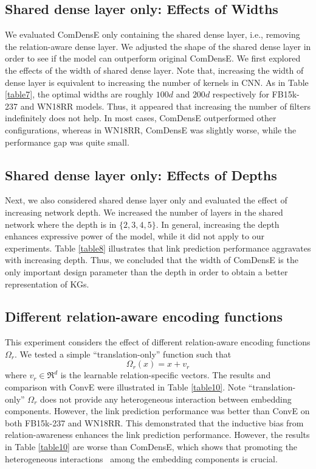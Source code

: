 \subsection{Shared dense layer only: Effects of Widths}
We evaluated ComDensE only containing the shared dense layer, i.e., removing the relation-aware dense layer. We adjusted the shape of the shared dense layer in order to see if the model can outperform original ComDensE. We first explored the effects of the width of shared dense layer. Note that, increasing the width of dense layer is equivalent to increasing the number of kernels in CNN. As in Table \ref{table7}, the optimal widths are roughly $100d$ and $200d$ respectively for FB15k-237 and WN18RR models. Thus, it appeared that increasing the number of filters indefinitely does not help. In most cases, ComDensE outperformed other configurations, whereas in WN18RR, ComDensE was slightly worse, while the performance gap was quite small.

\subsection{Shared dense layer only: Effects of Depths}
Next, we also considered shared dense layer only and evaluated the effect of increasing network depth. We increased the number of layers in the shared network where the depth is in $\{2, 3, 4, 5\}$. In general, increasing the depth enhances expressive power of the model, while it did not apply to our experiments. Table \ref{table8} illustrates that link prediction performance aggravates with increasing depth. Thus, we concluded that the width of ComDensE is the only important design parameter than the depth in order to obtain a better representation of KGs.

\subsection{Different relation-aware encoding functions}
This experiment considers the effect of different relation-aware encoding functions $\Omega_r$. We tested a simple ``translation-only'' function such that
\begin{equation}
\Omega_r(x) = x + v_r
\label{eq9}
\end{equation}
where $v_r \in \Re^{d}$ is the learnable relation-specific vectors. The results and comparison with ConvE were illustrated in Table \ref{table10}. Note ``translation-only'' $\Omega_r$ does not provide any heterogeneous interaction between embedding components. However, the link prediction performance was better than ConvE on both FB15k-237 and WN18RR. This demonstrated that the inductive bias from relation-awareness enhances the link prediction performance. However, the results in Table \ref{table10} are worse than ComDensE, which shows that promoting the heterogeneous interactions~\cite{vashishth2020interacte} among the embedding components is crucial.

